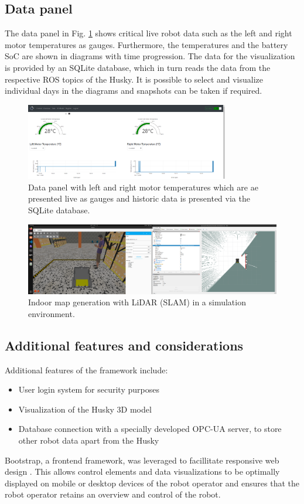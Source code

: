 \documentclass[letterpaper, 10 pt, conference]{ieeeconf}  %
\begin{document}
\subsection{Data panel}
The data panel in Fig. \ref{fig:overviewplots} shows critical live robot data such as the left and right motor temperatures as gauges. 
Furthermore, the temperatures and the battery SoC are shown in diagrams with time progression. 
The data for the visualization is provided by an SQLite database, which in turn reads the data from the respective ROS topics of the Husky. 
It is possible to select and visualize individual days in the diagrams and snapshots can be taken if required.
\begin{figure}[b]
    \centerline{\includegraphics[width=8.9cm]{images/overviewplots.png}}
    \caption{Data panel with left and right motor temperatures which are ae presented live as gauges and historic data is presented via the SQLite database.}
    \label{fig:overviewplots}
\end{figure}
\begin{figure}[htbp]
    \centerline{\includegraphics[width=16.35cm]{images/sim_husky_mapping.png}}
    \caption{Indoor map generation with LiDAR (SLAM) in a simulation environment.}
    \label{fig:huskymapping}
\end{figure}



\subsection{Additional features and considerations}
Additional features of the framework include: 
\begin{itemize}
\item User login system for security purposes
\item Visualization of the Husky 3D model 
\item Database connection with a specially developed OPC-UA server, to store other robot data apart from the Husky
\end{itemize}
Bootstrap, a frontend framework, was leveraged to facillitate responsive web design \cite{bootstrap}. 
This allows control elements and data visualizations to be optimally displayed on mobile or desktop devices of the robot operator and ensures that the robot operator retains an overview and control of the robot.
\end{document}
